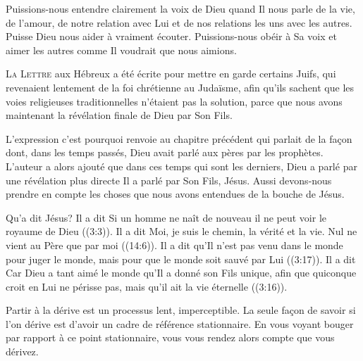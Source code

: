 Puissions-nous entendre clairement la voix de Dieu quand Il nous parle
 de la vie, de l'amour, de notre relation avec Lui et de nos relations
 les uns avec les autres. Puisse Dieu nous aider à vraiment écouter.
 Puissions-nous obéir à Sa voix et aimer les autres comme Il voudrait
 que nous aimions.

\dvrule






\lettrine{L}{a Lettre} aux Hébreux a été écrite pour mettre en garde
 certains Juifs, qui revenaient lentement de la foi chrétienne au Judaïsme,
 afin qu'ils sachent que les voies religieuses traditionnelles
 n'étaient pas la solution, parce que nous avons maintenant
 la révélation finale de Dieu par Son Fils. 

L'expression \Og c'est pourquoi \Fg{} renvoie au chapitre précédent
 qui parlait de la fa\c{c}on dont, dans les temps passés,
 Dieu avait parlé aux pères par les prophètes.
 L'auteur a alors ajouté que dans ces temps qui sont les derniers,
 Dieu a parlé par une révélation plus directe
 \ocadr Il a parlé par Son Fils, Jésus.
 Aussi devons-nous prendre en compte les choses que nous avons entendues
 de la bouche de Jésus. 


Qu'a dit Jésus? Il a dit\frcolon {}
 \Og Si un homme ne naît de nouveau il ne peut voir le royaume de Dieu \Fg{}
 ((3:3)).
 Il a dit\frcolon {}
 \Og Moi, je suis le chemin, la vérité et la vie.
 Nul ne vient au Père que par moi \Fg{} ((14:6)).
 Il a dit qu'Il n'est pas venu \Og dans le monde pour juger le monde,
 mais pour que le monde soit sauvé par Lui \Fg{} ((3:17)).
 Il a dit\frcolon {}
 \Og Car Dieu a tant aimé le monde qu'Il a donné son Fils unique,
 afin que quiconque croit en Lui ne périsse pas,
 mais qu'il ait la vie éternelle \Fg{} ((3:16)). 

Partir à la dérive est un processus lent, imperceptible.
 La seule fa\c{c}on de savoir si l'on dérive est d'avoir un cadre de référence
 stationnaire.
 En vous voyant bouger par rapport à ce point stationnaire,
 vous vous rendez alors compte que vous dérivez. 

